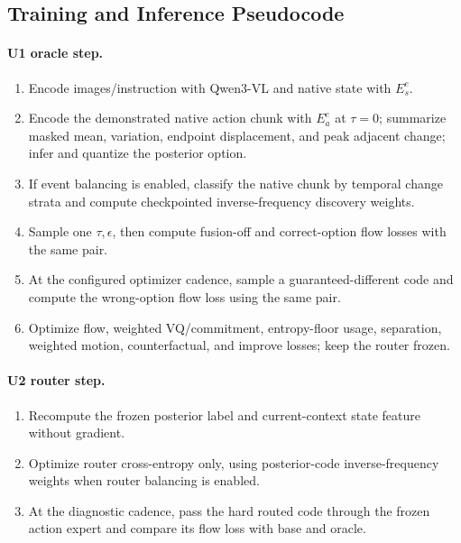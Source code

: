

\subsection{Training and Inference Pseudocode}

\paragraph{U1 oracle step.}
\begin{enumerate}
    \item Encode images/instruction with Qwen3-VL and native state with
    \(E_s^e\).
    \item Encode the demonstrated native action chunk with \(E_a^e\) at
    \(\tau=0\); summarize masked mean, variation, endpoint displacement, and
    peak adjacent change; infer and quantize the posterior option.
    \item If event balancing is enabled, classify the native chunk by temporal
    change strata and compute checkpointed inverse-frequency discovery weights.
    \item Sample one \(\tau,\epsilon\), then compute fusion-off and
    correct-option flow losses with the same pair.
    \item At the configured optimizer cadence, sample a guaranteed-different
    code and compute the wrong-option flow loss using the same pair.
    \item Optimize flow, weighted VQ/commitment, entropy-floor usage,
    separation, weighted motion, counterfactual, and improve losses; keep the
    router frozen.
\end{enumerate}

\paragraph{U2 router step.}
\begin{enumerate}
    \item Recompute the frozen posterior label and current-context state
    feature without gradient.
    \item Optimize router cross-entropy only, using posterior-code
    inverse-frequency weights when router balancing is enabled.
    \item At the diagnostic cadence, pass the hard routed code through the
    frozen action expert and compare its flow loss with base and oracle.
\end{enumerate}

